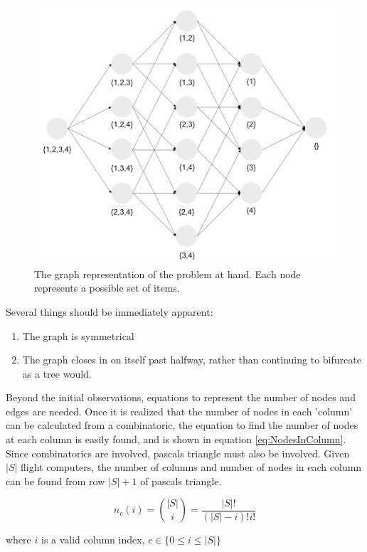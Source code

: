\documentclass{article}
\begin{document}
\begin{figure}[h]
    \center
    \includegraphics[scale=1]{img/Graph.png}
    \caption{The graph representation of the problem at hand. Each node represents a possible set of items.}
    \label{fig:Graph}
\end{figure}

Several things should be immediately apparent:
\begin{enumerate}
    \item The graph is symmetrical
    \item The graph closes in on itself past halfway, rather than continuing to bifurcate as a tree would.
\end{enumerate}

Beyond the initial observations, equations to represent the number of nodes and edges are needed. Once it is realized that the number of nodes in each 'column' can be calculated from a combinatoric, the equation to find the number of nodes at each column is easily found, and is shown in equation \ref{eq:NodesInColumn}. Since combinatorics are involved, pascals triangle must also be involved. Given $|S|$ flight computers, the number of columns and number of nodes in each column can be found from row $|S|+1$ of pascals triangle.

\begin{equation}
    n_c(i)=\binom{|S|}{i}=\frac{|S|!}{(|S|-i)!i!}
    \label{eq:NodesInColumn}
\end{equation}
\centerline{where $i$ is a valid column index, $c\in \{ 0\le i\le |S|\}$}
\end{document}
